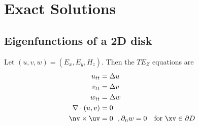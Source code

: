 \documentclass[10pt]{article}
\newcommand{\grad}{\nabla}
\begin{document}

\clearpage
\section{Exact Solutions}

\subsection{Eigenfunctions of a 2D disk}\label{sec:diskEigenfunctions}


Let $(u,v,w)=(E_x,E_y,H_z)$. Then the $TE_Z$ equations are 
\begin{align*}
  u_{tt} & = \Delta u \\
  v_{tt} & = \Delta v \\
  w_{tt} & = \Delta w \\
  \grad\cdot (u,v) &= 0 \\
  \nv\times\uv&=0 ~~, \partial_n w =0 \quad\mbox{for $\xv\in\partial D$}
\end{align*}
\end{document}
